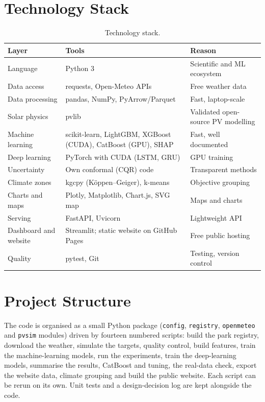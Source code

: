 \documentclass[12pt]{report}
\begin{document}
\section{Technology Stack}
\vspace{1mm}
\begin{table}[htbp]
\centering
\caption{Technology stack.}
\label{tab:tech}
\begin{tabularx}{\textwidth}{p{3.4cm}Lp{4.4cm}}
\toprule
Layer & Tools & Reason \\
\midrule
Language & Python 3 & Scientific and ML ecosystem \\
Data access & requests, Open-Meteo APIs & Free weather data \\
Data processing & pandas, NumPy, PyArrow/Parquet & Fast, laptop-scale \\
Solar physics & pvlib & Validated open-source PV modelling \\
Machine learning & scikit-learn, LightGBM, XGBoost (CUDA), CatBoost (GPU), SHAP & Fast, well documented \\
Deep learning & PyTorch with CUDA (LSTM, GRU) & GPU training \\
Uncertainty & Own conformal (CQR) code & Transparent methods \\
Climate zones & kgcpy (Köppen--Geiger), k-means & Objective grouping \\
Charts and maps & Plotly, Matplotlib, Chart.js, SVG map & Maps and charts \\
Serving & FastAPI, Uvicorn & Lightweight API \\
Dashboard and website & Streamlit; static website on GitHub Pages & Free public hosting \\
Quality & pytest, Git & Testing, version control \\
\bottomrule
\end{tabularx}
\end{table}

\section{Project Structure}
\vspace{1mm}
The code is organised as a small Python package (\texttt{config}, \texttt{registry}, \texttt{openmeteo} and \texttt{pvsim} modules) driven by fourteen numbered scripts: build the park registry, download the weather, simulate the targets, quality control, build features, train the machine-learning models, run the experiments, train the deep-learning models, summarise the results, CatBoost and tuning, the real-data check, export the website data, climate grouping and build the public website. Each script can be rerun on its own. Unit tests and a design-decision log are kept alongside the code.
\end{document}
